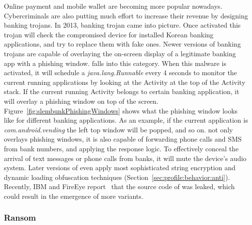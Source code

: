Online payment and mobile wallet are becoming more popular nowadays.
Cybercriminals are also putting much effort to increase their revenue
by designing banking trojans.
In 2013, banking trojan  came into picture.
Once activated this trojan will check the 
compromised device for installed Korean banking applications,
and try to replace them with fake ones. 
Newer versions of banking trojans are capable of overlaying the
on-screen display of a legitimate banking app with a phishing
window.
 falls into this category.
When this malware is activated, it will
schedule a {\em java.lang.Runnable} every 4 seconds to monitor
the current running applications by looking at the Activity
at the top of the Activity stack.
If the current running Activity belongs to certain banking
application, it will overlay a phishing window on top of the screen.
Figure~\ref{fig:slembunkPhishingWindows} shows what the phishing window
looks like for different banking applications. As an example,
if the current application is {\em com.android.vending} the left top window will be popped, and so on.
 not only overlays phishing windows,
it is also capable of forwarding phone calls and SMS from bank
numbers, and applying the response logic.
To effectively conceal the arrival of text messages or phone calls from banks,
it will mute the device's audio system.
Later versions of  even apply most sophisticated
string encryption and dynamic loading obfuscation techniques
(Section~\ref{sec:profile:behavior:anti}).
Recently, IBM and FireEye report~\cite{sourceCodeLeakedFireeye,sourceCodeLeakedIBM} that
the source code of  was leaked, which
could result in the emergence of more variants.

\vspace{-.15in}
\subsubsection{Ransom}
\label{sec:profile:monetize:ransomware}


